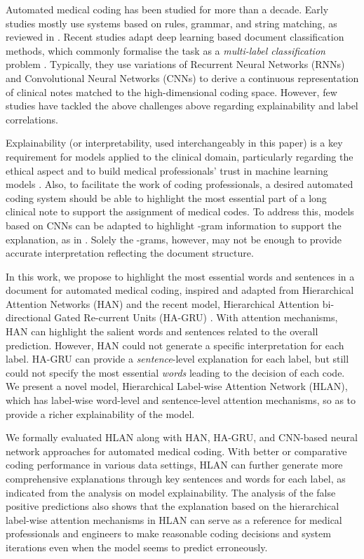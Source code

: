 \documentclass[final,5p,times,twocolumn]{elsarticle}
\begin{document}
Automated medical coding has been studied for more than a decade. Early studies mostly use systems based on rules, grammar, and string matching, as reviewed in \cite{stanfill_systematic_2010}. Recent studies adapt deep learning based document classification methods, which commonly formalise the task as a \textit{multi-label classification} problem \cite{karimi-etal-2017-automatic,mullenbach-etal-2018-explainable,baumel2018multi}. Typically, they use variations of Recurrent Neural Networks (RNNs) and Convolutional Neural Networks (CNNs) to derive a continuous representation of clinical notes matched to the high-dimensional coding space. However, few studies have tackled the above challenges above regarding explainability and label correlations.

Explainability (or interpretability, used interchangeably in this paper) is a key requirement for models applied to the clinical domain, particularly regarding the ethical aspect and to build medical professionals' trust in machine learning models \cite{geis2019ethics,goodman2017european}. Also, to facilitate the work of coding professionals, a desired automated coding system should be able to highlight the most essential part of a long clinical note to support the assignment of medical codes. To address this, models based on CNNs can be adapted to highlight -gram information to support the explanation, as in \cite{mullenbach-etal-2018-explainable}. Solely the -grams, however, may not be enough to provide accurate interpretation reflecting the document structure.

In this work, we propose to highlight the most essential words and sentences in a document for automated medical coding, inspired and adapted from Hierarchical Attention Networks (HAN) \cite{yang2016} and the recent model, Hierarchical Attention bi-directional Gated Re-current Units (HA-GRU) \cite{baumel2018multi}. With attention mechanisms, HAN can highlight the salient words and sentences related to the overall prediction. However, HAN could not generate a specific interpretation for each label. HA-GRU \cite{baumel2018multi} can provide a \emph{sentence}-level explanation for each label, but still could not specify the most essential \emph{words} leading to the decision of each code. We present a novel model, Hierarchical Label-wise Attention Network (HLAN), which has label-wise word-level and sentence-level attention mechanisms, so as to provide a richer explainability of the model.

We formally evaluated HLAN along with HAN, HA-GRU, and CNN-based neural network approaches for automated medical coding. With better or comparative coding performance in various data settings,  HLAN can further generate more comprehensive explanations through key sentences and words for each label, as indicated from the analysis on model explainability. The analysis of the false positive predictions also shows that the explanation based on the hierarchical label-wise attention mechanisms in HLAN can serve as a reference for medical professionals and engineers to make reasonable coding decisions and system iterations even when the model seems to predict erroneously.
\end{document}
